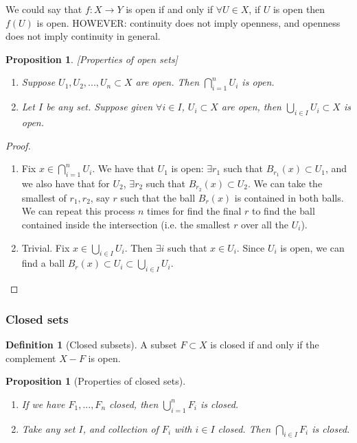 \documentclass{article}
\theoremstyle{definition}
\newtheorem{defn}{Definition}[section]
\theoremstyle{plain}%
\newtheorem{prop}[thm]{Proposition}
\theoremstyle{remark}
\newcommand{\Union}{\bigcup}
\begin{document}
We could say that $f : X \to Y$ is open if and only if $\forall U \in X$, if $U$ is open then $f(U)$ is open. HOWEVER: continuity does not imply openness, and openness does not imply continuity in general.

\begin{prop}\label{prop open sets}[Properties of open sets]
\hspace{0.1em}
\begin{enumerate}
    \item Suppose $U_1, U_2, ..., U_n \subset X$ are open. Then $\bigcap_{i=1}^n U_i$ is open.
    \item Let $I$ be any set. Suppose given $\forall i \in I$, $U_i \subset X$ are open, then $\Union_{i \in I}U_i \subset X$ is open.
\end{enumerate}
\end{prop}

\begin{proof}
\hspace{0.1em}
\begin{enumerate}
    \item Fix $x \in \bigcap_{i=1}^{n}U_i$. We have that $U_1$ is open: $\exists r_1$ such that $B_{r_1}(x)\subset U_1$, and we also have that for $U_2$, $\exists r_2$ such that $B_{r_2}(x) \subset U_2$. We can take the smallest of $r_1, r_2$, say $r$ such that the ball $B_r(x)$ is contained in both balls. We can repeat this process $n$ times for find the final $r$ to find the ball contained inside the intersection (i.e. the smallest $r$ over all the $U_i$).
    \item Trivial. Fix $x \in \Union_{i \in I} U_i$. Then $\exists i $ such that $x \in U_i$. Since $U_i$ is open, we can find a ball $B_r(x) \subset U_i \subset \Union_{i \in I} U_i$.
\end{enumerate}
\end{proof}

\subsubsection{Closed sets}

\begin{defn}[Closed subsets]
A subset $F \subset X$ is closed if and only if the complement $X-F$ is open.
\end{defn}

\begin{prop}[Properties of closed sets]
\hspace{0.1em}
\begin{enumerate}
    \item If we have $F_1, ... , F_n$ closed, then $\Union_{i=1}^n F_i$ is closed.
    \item Take any set $I$, and collection of $F_i$ with $i \in I$ closed. Then $\bigcap_{i \in I} F_i$ is closed.
\end{enumerate}
\end{prop}
\end{document}
